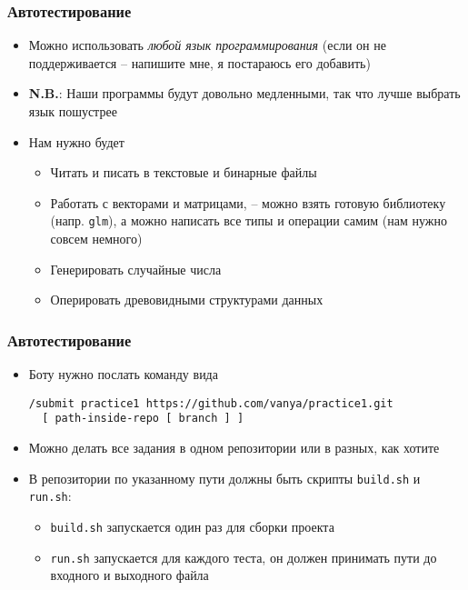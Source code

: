\documentclass[10pt]{beamer}
\begin{document}
\begin{frame}[fragile]
\frametitle{Автотестирование}
\begin{itemize}
\item Можно использовать \textit{любой язык программирования} (если он не поддерживается -- напишите мне, я постараюсь его добавить)
\pause
\item \alert{\textbf{N.B.}}: Наши программы будут довольно медленными, так что лучше выбрать язык пошустрее
\pause
\item Нам нужно будет
\begin{itemize}
\item Читать и писать в текстовые и бинарные файлы
\pause
\item Работать с векторами и матрицами, -- можно взять готовую библиотеку (напр. \texttt{glm}), а можно написать все типы и операции самим (нам нужно совсем немного)
\pause
\item Генерировать случайные числа
\pause
\item Оперировать древовидными структурами данных
\end{itemize}
\end{itemize}
\end{frame}

\begin{frame}[fragile]
\frametitle{Автотестирование}
\begin{itemize}
\item Боту нужно послать команду вида
\begin{verbatim}
/submit practice1 https://github.com/vanya/practice1.git
  [ path-inside-repo [ branch ] ]
\end{verbatim}
\pause
\item Можно делать все задания в одном репозитории или в разных, как хотите
\pause
\item В репозитории по указанному пути должны быть скрипты \texttt{build.sh} и \texttt{run.sh}:
\begin{itemize}
\item \texttt{build.sh} запускается один раз для сборки проекта
\item \texttt{run.sh} запускается для каждого теста, он должен принимать пути до входного и выходного файла
\end{itemize}
\end{itemize}
\end{frame}
\end{document}
